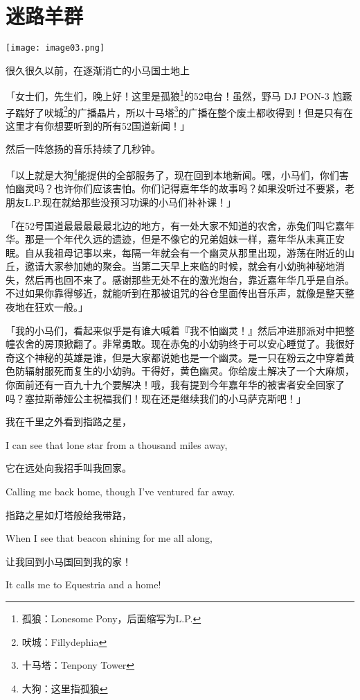 \chapter{迷路羊群}

\texttt{[image: image03.png]}

\begin{intro}
很久很久以前，在逐渐消亡的小马国土地上
\end{intro}

「{\rt 女士们，先生们，晚上好！这里是孤狼\footnote{孤狼：Lonesome Pony，后面缩写为L.P.}的52电台！虽然，野马 DJ PON-3 尥蹶子踹好了吠城\footnote{吠城：Fillydephia}的广播晶片，所以十马塔\footnote{十马塔：Tenpony Tower}的广播在整个废土都收得到！但是只有在这里才有你想要听到的所有52国道新闻！}」

然后一阵悠扬的音乐持续了几秒钟。

「{\rt 以上就是大狗\footnote{大狗：这里指孤狼}能提供的全部服务了，现在回到本地新闻。嘿，小马们，你们害怕幽灵吗？也许你们应该害怕。你们记得嘉年华的故事吗？如果没听过不要紧，老朋友L.P.现在就给那些没预习功课的小马们补补课！}」

「{\rt 在52号国道最最最最最北边的地方，有一处大家不知道的农舍，赤兔们叫它嘉年华。那是一个年代久远的遗迹，但是不像它的兄弟姐妹一样，嘉年华从未真正安眠。自从我祖母记事以来，每隔一年就会有一个幽灵从那里出现，游荡在附近的山丘，邀请大家参加她的聚会。当第二天早上来临的时候，就会有小幼驹神秘地消失，然后再也回不来了。感谢那些无处不在的激光炮台，靠近嘉年华几乎是自杀。不过如果你靠得够近，就能听到在那被诅咒的谷仓里面传出音乐声，就像是整天整夜地在狂欢一般。}」

「{\rt 我的小马们，看起来似乎是有谁大喊着『我不怕幽灵！』然后冲进那派对中把整幢农舍的房顶掀翻了。非常勇敢。现在赤兔的小幼驹终于可以安心睡觉了。我很好奇这个神秘的英雄是谁，但是大家都说她也是一个幽灵。是一只在粉云之中穿着黄色防辐射服死而复生的小幼驹。干得好，黄色幽灵。你给废土解决了一个大麻烦，你面前还有一百九十九个要解决！哦，我有提到今年嘉年华的被害者安全回家了吗？塞拉斯蒂娅公主祝福我们！现在还是继续我们的小马萨克斯吧！}」

\begin{song}
我在千里之外看到指路之星，

I can see that lone star from a thousand miles away,

\medskip

它在远处向我招手叫我回家。

Calling me back home, though I've ventured far away.

\medskip

指路之星如灯塔般给我带路，

When I see that beacon shining for me all along,

\medskip

让我回到小马国回到我的家！

It calls me to Equestria and a home!
\end{song}

